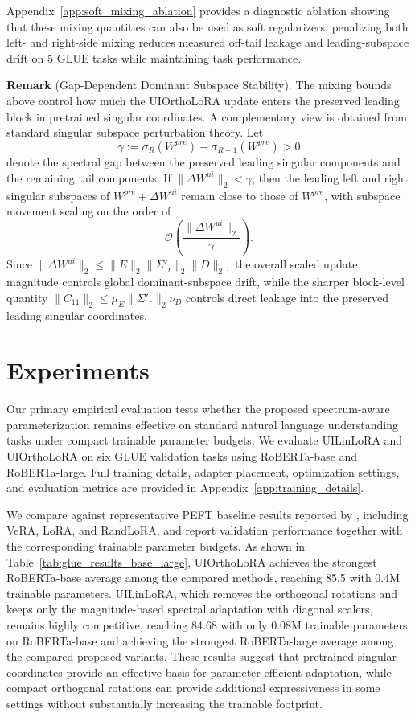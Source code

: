 \documentclass{article}
\begin{document}
Appendix~\ref{app:soft_mixing_ablation} provides a diagnostic ablation showing
that these mixing quantities can also be used as soft regularizers: penalizing
both left- and right-side mixing reduces measured off-tail leakage and
leading-subspace drift on 5 GLUE tasks while maintaining task performance.


\noindent \textbf{Remark} (Gap-Dependent Dominant Subspace Stability).
The mixing bounds above control how much the UIOrthoLoRA update enters the
preserved leading block in pretrained singular coordinates. A complementary
view is obtained from standard singular subspace perturbation theory. Let
\[
\gamma := \sigma_R(W^{pre}) - \sigma_{R+1}(W^{pre}) > 0
\]
denote the spectral gap between the preserved leading singular components and
the remaining tail components. If $\|\Delta W^{ui}\|_2 < \gamma$, then the leading left and right singular subspaces of $W^{pre}+\Delta W^{ui}$
remain close to those of \(W^{pre}\), with subspace movement scaling on the
order of
\[
\mathcal{O}\left(\frac{\|\Delta W^{ui}\|_2}{\gamma}\right).
\]
Since $\|\Delta W^{ui}\|_2
\leq
\|E\|_2\|\Sigma'_r\|_2\|D\|_2,
$
the overall scaled update magnitude controls global dominant-subspace drift,
while the sharper block-level quantity $\|C_{11}\|_2
\leq
\mu_E\|\Sigma'_r\|_2\nu_D
$
controls direct leakage into the preserved leading singular coordinates.

\section{Experiments}
\label{sec:experiments}

Our primary empirical evaluation tests whether the proposed spectrum-aware
parameterization remains effective on standard natural language understanding
tasks under compact trainable parameter budgets. We evaluate UILinLoRA and
UIOrthoLoRA on six GLUE validation tasks using RoBERTa-base and RoBERTa-large. Full training
details, adapter placement, optimization settings, and evaluation metrics are
provided in Appendix~\ref{app:training_details}.

We compare against representative PEFT baseline results reported by
\citet{albert2025randlora}, including VeRA, LoRA, and RandLoRA, and report
validation performance together with the corresponding trainable parameter
budgets. As shown in 
Table~\ref{tab:glue_results_base_large}, UIOrthoLoRA achieves the strongest
RoBERTa-base average among the compared methods, reaching 85.5 with 0.4M
trainable parameters. UILinLoRA, which removes the orthogonal rotations and
keeps only the magnitude-based spectral adaptation with diagonal scalers,
remains highly competitive, reaching 84.68 with only 0.08M trainable parameters
on RoBERTa-base and achieving the strongest RoBERTa-large average among the
compared proposed variants. These results suggest that pretrained singular
coordinates provide an effective basis for parameter-efficient adaptation, while
compact orthogonal rotations can provide additional expressiveness in some
settings without substantially increasing the trainable footprint.
\end{document}
